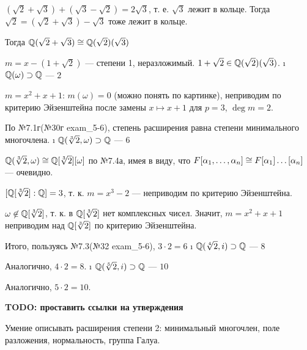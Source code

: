 \begin{solution}
\begin{itemize}
\begin{solution}
	$(\sqrt2+\sqrt3)+(\sqrt3-\sqrt2) = 2\sqrt3$, т. е. $\sqrt3$ лежит в кольце. Тогда $\sqrt2 = (\sqrt2+\sqrt3)-\sqrt3$ тоже лежит в кольце.
  \end{solution}
  
  Тогда $\mathbb{Q}(\sqrt2+\sqrt{3}) \cong \mathbb{Q}(\sqrt2)(\sqrt{3})$
  
  $m = x-(1+\sqrt2)$ --- степени 1, неразложимый. $1+\sqrt2 \in \mathbb{Q}(\sqrt2)(\sqrt{3})$.
\i
  \(\mathbb{Q}(\omega) \supset \mathbb{Q}\) --- \(2\)
  
  $m = x^2+x+1$: $m(\omega) = 0$ (можно понять по картинке), неприводим по критерию Эйзенштейна после замены $x \mapsto x+1$ для $p=3$, $\deg m = 2$.
  
  По №7.1г(№30г exam\_5-6), степень расширения равна степени минимального многочлена.
\i
  \(\mathbb{Q}(\sqrt[3]{2}, \omega) \supset \mathbb{Q}\) --- \(6\)
  
  $\mathbb{Q}(\sqrt[3]{2}, \omega) \cong \mathbb{Q}[\sqrt[3]{2}][\omega]$ по №7.4а, имея в виду, что $F[\alpha_1, \dots, \alpha_n] \cong F[\alpha_1]\dots[\alpha_n]$ --- очевидно.
  
  $[\mathbb{Q}[\sqrt[3]{2}]:\mathbb{Q}] = 3$, т. к. $m = x^3-2$ --- неприводим по критерию Эйзенштейна.
  
  $\omega \not\in \mathbb{Q}[\sqrt[3]{2}]$, т. к. в $\mathbb{Q}[\sqrt[3]{2}]$ нет комплексных чисел. Значит, $m = x^2+x+1$ неприводим над $\mathbb{Q}[\sqrt[3]{2}]$ по критерию Эйзенштейна.
  
  Итого, пользуясь №7.3(№32 exam\_5-6), $3\cdot 2 = 6$
\i
  \(\mathbb{Q}(\sqrt[4]{2}, i) \supset \mathbb{Q}\) --- \(8\)
  
  Аналогично, $4\cdot2 = 8$.
\i
  \(\mathbb{Q}(\sqrt[5]{2}, i) \supset \mathbb{Q}\) --- \(10\)
  
  Аналогично, $5\cdot2 = 10$.
\end{itemize}

\bf{TODO: проставить ссылки на утверждения}
\end{solution}

\begin{problem}[35(6.10,8.9а,10.5)] Умение описывать расширения степени 2: минимальный многочлен, поле разложения, нормальность, группа Галуа.
\end{problem}

